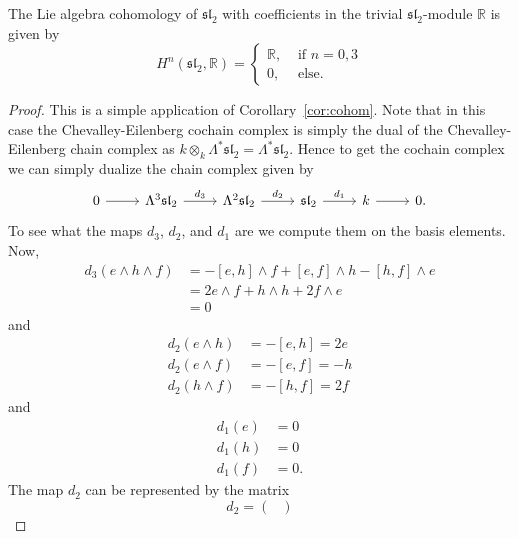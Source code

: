 \begin{proposition}
  The Lie algebra cohomology of $ \mathfrak{sl}_2 $ with coefficients in the trivial $ \mathfrak{sl}_2 $-module $ \mathbb{R} $ is given by
  \begin{equation}
    H^{n}(\mathfrak{sl}_2, \mathbb{R}) = \begin{cases}
      \mathbb{R}, &\text{ if }n =0,3\\
      0, &\text{ else.}
    \end{cases}
  \end{equation}
\end{proposition}
\begin{proof}
  This is a simple application of Corollary~\ref{cor:cohom}. Note that in this case the Chevalley-Eilenberg cochain complex is simply the dual of the Chevalley-Eilenberg chain complex as $ k \otimes_k \Lambda^{*}\mathfrak{sl}_2 = \Lambda^{*}\mathfrak{sl}_2 $. Hence to get the cochain complex we can simply dualize the chain complex given by
  \[\begin{tikzcd}
	  0 & {\Lambda^3\mathfrak{sl}_2} & {\Lambda^2\mathfrak{sl}_2} & {\mathfrak{sl}_2} & k & 0.
	  \arrow[from=1-1, to=1-2]
	  \arrow[from=1-5, to=1-6]
	  \arrow["{d_1}", from=1-4, to=1-5]
	  \arrow["{d_2}", from=1-3, to=1-4]
	  \arrow["{d_3}", from=1-2, to=1-3]
  \end{tikzcd}\]
  To see what the maps $ d_3 $, $ d_2 $, and $ d_1 $ are we compute them on the basis elements. Now,
  \begin{align*}
    d_3(e\wedge h \wedge f) &= -[e,h]\wedge f + [e,f]\wedge h - [h,f]\wedge e \\
                            &= 2e\wedge f + h\wedge h + 2f \wedge e \\
                            &= 0
  \end{align*}
  and
  \begin{align*}
    d_2(e \wedge h) &= -[e,h] = 2e \\
    d_2(e\wedge f) &= -[e,f] = -h \\
    d_2(h \wedge f) &= -[h, f] = 2f
  \end{align*}
  and
  \begin{align*}
    d_1(e) &= 0 \\
    d_1(h) &= 0 \\
    d_1(f) &= 0
  .\end{align*}
  The map $ d_2 $ can be represented by the matrix
  \begin{equation}
    d_2 = \begin{pmatrix}

\end{pmatrix}
\end{equation}
\end{proof}
